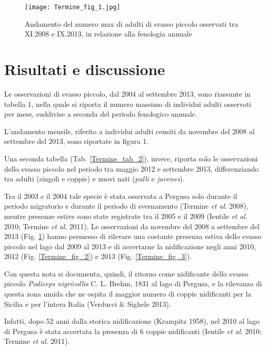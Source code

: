 \begin{figure}[!h]
\centering
\texttt{[image: Termine\_fig\_1.jpg]}
\caption{Andamento del numero max di adulti di svasso piccolo osservati tra XI.2008 e IX.2013, in relazione alla fenologia annuale}
\label{Termine_fig_1}
\end{figure}

\section*{Risultati e discussione}

Le osservazioni di svasso piccolo, dal 2004 al settembre 2013, sono
riassunte in tabella 1, nella quale si riporta il numero massimo di
individui adulti osservati per mese, suddivise a seconda del periodo
fenologico annuale.

L{\textquoteright}andamento mensile, riferito a individui adulti censiti
da novembre del 2008 al settembre del 2013, sono riportate in figura 1.

Una seconda tabella (Tab. \ref{Termine_tab_2}), invece, riporta solo le osservazioni dello
svasso piccolo nel periodo tra maggio 2012 e settembre 2013,
differenziando tra adulti (singoli e coppie) e nuovi nati
(\textit{pulli} e \textit{juvenes}).

{Tra il 2003 e il 2004 tale specie \`e stata osservata
a Pergusa solo durante il periodo migratorio e durante il periodo di
svernamento} (Termine \textit{et al}. 2008){, mentre
presenze estive sono state registrate tra il 2005 e il 2009 (}Ientile
\textit{et al}. 2010; {Termine
}\textit{{et al.}}{ 2011). Le
osservazioni da novembre del 2008 a settembre del 2013 (Fig. \ref{Termine_fig_1}) hanno
permesso di rilevare una costante presenza estiva dello svasso piccolo
nel lago dal 2009 al 2013 e di accertarne la nidificazione negli anni
2010, 2012 (Fig. \ref{Termine_fig_2}) e 2013 (Fig. \ref{Termine_fig_3}).}

Con questa nota si documenta, quindi, il ritorno come nidificante dello
svasso piccolo \textit{Podiceps nigricollis} C. L. Brehm, 1831 al lago
di Pergusa, e la rilevanza di questa zona umida che ne ospita il
maggior numero di coppie nidificanti per la Sicilia e per
l{\textquoteright}intera Italia (Verducci \& Sighele 2013).

{Infatti, dopo 52 anni dalla storica nidificazione
(Krampitz 1958), nel 2010 al lago di Pergusa \`e stata accertata la}
presenza di 6 coppie nidificanti (Ientile \textit{et al}. 2010; Termine
\textit{et al}. 2011).

